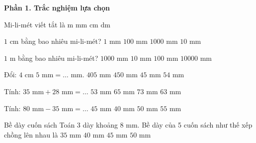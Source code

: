 \textbf{Phần 1. Trắc nghiệm lựa chọn}

\begin{ex} %
Mi-li-mét viết tắt là
\choice
{$\text{m}$}
{\True $\text{mm}$}
{$\text{cm}$}
{$\text{dm}$}
\end{ex}

\begin{ex} %
$1\text{ cm}$ bằng bao nhiêu mi-li-mét?
\choice
{$1\text{ mm}$}
{$100\text{ mm}$}
{$1000\text{ mm}$}
{\True $10\text{ mm}$}
\end{ex}

\begin{ex} %
$1\text{ m}$ bằng bao nhiêu mi-li-mét?
\choice
{\True $1000\text{ mm}$}
{$10\text{ mm}$}
{$100\text{ mm}$}
{$10000\text{ mm}$}
\end{ex}

\begin{ex} %
Đổi: $4\text{ cm } 5\text{ mm} = \dots\text{ mm}$.
\choice
{$405\text{ mm}$}
{$450\text{ mm}$}
{\True $45\text{ mm}$}
{$54\text{ mm}$}
\end{ex}

\begin{ex} %
Tính: $35\text{ mm} + 28\text{ mm} = \dots$
\choice
{$53\text{ mm}$}
{$65\text{ mm}$}
{$73\text{ mm}$}
{\True $63\text{ mm}$}
\end{ex}

\begin{ex} %
Tính: $80\text{ mm} - 35\text{ mm} = \dots$
\choice
{\True $45\text{ mm}$}
{$40\text{ mm}$}
{$50\text{ mm}$}
{$55\text{ mm}$}
\end{ex}

\begin{ex} %
Bề dày cuốn sách Toán 3 dày khoảng $8\text{ mm}$. Bề dày của 5 cuốn sách như thế xếp chồng lên nhau là
\choice
{$35\text{ mm}$}
{\True $40\text{ mm}$}
{$45\text{ mm}$}
{$50\text{ mm}$}
\end{ex}

